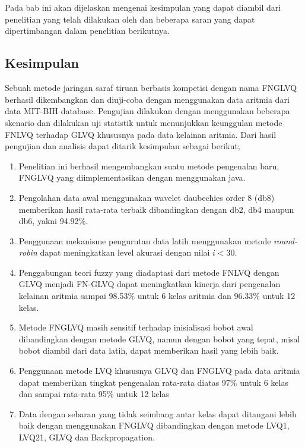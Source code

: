 \chapter{\kesimpulan}
Pada bab ini akan dijelaskan mengenai kesimpulan yang dapat diambil dari
penelitian yang telah dilakukan oleh \saya dan beberapa saran yang dapat
dipertimbangan dalam penelitian berikutnya.

\section{Kesimpulan}
Sebuah metode jaringan saraf tiruan berbasis kompetisi dengan nama
FNGLVQ berhasil dikembangkan dan diuji-coba dengan menggunakan data aritmia
dari data MIT-BIH database. Pengujian dilakukan dengan menggunakan beberapa
skenario dan dilakukan uji statistik untuk menunjukkan keunggulan metode FNLVQ
terhadap GLVQ khususnya pada data kelainan aritmia. Dari hasil pengujian dan
analisis dapat ditarik kesimpulan sebagai berikut;
\begin{enumerate}
  \item Penelitian ini berhasil mengembangkan suatu metode pengenalan baru,
  FNGLVQ yang diimplementasikan dengan menggunakan java.
  \item Pengolahan data awal menggunakan wavelet daubechies order 8 (db8)
  memberikan hasil rata-rata terbaik dibandingkan dengan db2, db4 maupun
  db6, yakni 94.92\%. 


  \item Penggunaan mekanisme pengurutan data latih menggunakan metode
  \emph{round-robin} dapat meningkatkan level akurasi dengan nilai $i < 30$.
  \item Penggabungan teori fuzzy yang diadaptasi dari metode FNLVQ dengan
  GLVQ menjadi FN-GLVQ dapat meningkatkan kinerja dari pengenalan kelainan
  aritmia sampai 98.53\% untuk 6 kelas aritmia dan 96.33\% untuk 12 kelas.
  \item Metode FNGLVQ masih sensitif terhadap inisialisasi bobot awal
  dibandingkan dengan metode GLVQ, namun dengan bobot yang tepat, misal bobot
  diambil dari data latih, dapat memberikan hasil yang lebih baik.
  \item Penggunaan metode LVQ khususnya GLVQ dan FNGLVQ pada data aritmia
  dapat memberikan tingkat pengenalan rata-rata diatas 97\% untuk 6 kelas dan
  sampai rata-rata 95\% untuk 12 kelas
  \item Data dengan sebaran yang tidak seimbang antar kelas dapat ditangani
  lebih baik dengan menggunakan FNGLVQ dibandingkan dengan metode LVQ1, LVQ21,
  GLVQ dan Backpropagation.
\end{enumerate}

